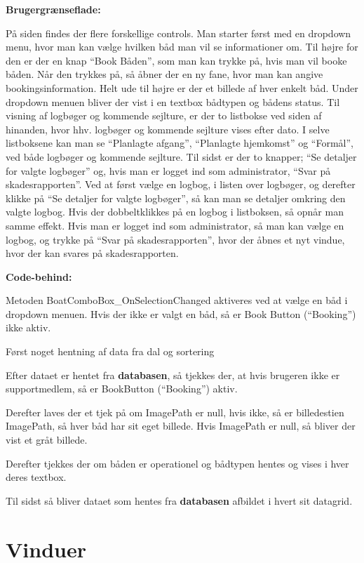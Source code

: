 \textbf{Brugergrænseflade:}

På siden findes der flere forskellige controls.
Man starter først med en dropdown menu, hvor man kan vælge hvilken båd man vil se informationer om.
Til højre for den er der en knap ``Book Båden'', som man kan trykke på, hvis man vil booke båden. Når den trykkes på, så åbner der en ny fane, hvor man kan angive bookingsinformation. 
Helt ude til højre er der et billede af hver enkelt båd. 
Under dropdown menuen bliver der vist i en textbox bådtypen og bådens status. 
Til visning af logbøger og kommende sejlture, er der to listbokse ved siden af hinanden, hvor hhv. logbøger og kommende sejlture vises efter dato. 
I selve listboksene kan man se ``Planlagte afgang'', ``Planlagte hjemkomst'' og ``Formål'', ved både logbøger og kommende sejlture. 
Til sidst er der to knapper; ``Se detaljer for valgte logbøger'' og, hvis man er logget ind som administrator, ``Svar på skadesrapporten''. Ved at først vælge en logbog, i listen over logbøger, og derefter klikke på ``Se detaljer for valgte logbøger'', så kan man se detaljer omkring den valgte logbog. 
Hvis der dobbeltklikkes på en logbog i listboksen, så opnår man samme effekt. 
Hvis man er logget ind som administrator, så man kan vælge en logbog, og trykke på ``Svar på skadesrapporten'', hvor der åbnes et nyt vindue, hvor der kan svares på skadesrapporten. 

\textbf{Code-behind:}

Metoden BoatComboBox\_OnSelectionChanged aktiveres ved at vælge en båd i dropdown menuen. 
Hvis der ikke er valgt en båd, så er Book Button (``Booking'') ikke aktiv. 

Først noget hentning af data fra dal og sortering

Efter dataet er hentet fra \textbf{databasen}, så tjekkes der, at hvis brugeren ikke er supportmedlem, så er BookButton (``Booking'') aktiv. 

Derefter laves der et tjek på om ImagePath er null, hvis ikke, så er billedestien ImagePath, så hver båd har sit eget billede. 
Hvis ImagePath er null, så bliver der vist et gråt billede.

Derefter tjekkes der om båden er operationel og bådtypen hentes og vises i hver deres textbox. 

Til sidst så bliver dataet som hentes fra \textbf{databasen} afbildet i hvert sit datagrid.


\section{Vinduer}
